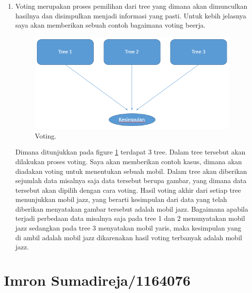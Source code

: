 \begin{enumerate}
\item Voting merupakan proses pemilihan dari tree yang dimana akan dimunculkan hasilnya dan disimpulkan menjadi informasi yang pasti. Untuk kebih jelasnya saya akan memberikan sebuah contoh bagaimana voting beerja.
	
	\begin{figure}[ht]
	\centerline{\includegraphics[width=1\textwidth]{figures/YN/YNVoting.PNG}}
	\caption{Voting.}
	\label{YNV}
	\end{figure}

Dimana ditunjukkan pada figure \ref{YNV} terdapat 3 tree. Dalam tree tersebut akan dilakukan proses voting. Saya akan memberikan contoh kasus, dimana akan diadakan voting untuk menentukan sebuah mobil. Dalam tree akan diberikan sejumlah data misalnya saja data tersebut berupa gambar, yang dimana data tersebut akan dipilih dengan cara voting. Hasil voting akhir dari setiap tree menunjukkan mobil jazz, yang berarti kesimpulan dari data yang telah diberikan menyatakan gambar tersebut adalah mobil jazz. Bagaimana apabila terjadi perbedaan data misalnya saja pada tree 1 dan 2 menunyatakan mobil jazz sedangkan pada tree 3 menyatakan mobil yaris, maka kesimpulan yang di ambil adalah mobil jazz dikarenakan hasil voting terbanyak adalah mobil jazz.

\end{enumerate}


\section{Imron Sumadireja/1164076}
